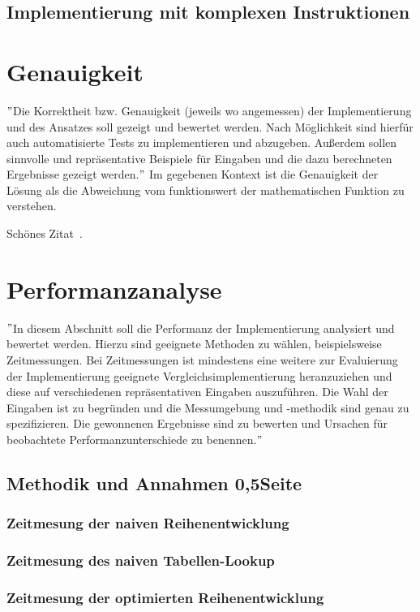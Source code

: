 \documentclass[course=erap]{aspdoc}
\begin{document}
\subsection{Implementierung mit komplexen Instruktionen}

\section{Genauigkeit}
\("\)Die Korrektheit bzw. Genauigkeit (jeweils wo angemessen) der Implementierung und des Ansatzes soll gezeigt und bewertet werden. Nach Möglichkeit sind hierfür auch automatisierte Tests zu implementieren und abzugeben. Außerdem sollen sinnvolle und repräsentative Beispiele für Eingaben und die dazu berechneten Ergebnisse gezeigt werden.\("\)
Im gegebenen Kontext ist die Genauigkeit der Lösung als die Abweichung vom funktionswert der mathematischen Funktion zu verstehen.

Schönes Zitat~\cite{buch}.

\section{Performanzanalyse}
\("\)In diesem Abschnitt soll die Performanz der Implementierung analysiert und bewertet werden. Hierzu sind geeignete Methoden zu wählen, beispielsweise Zeitmessungen. Bei Zeitmessungen ist mindestens eine weitere zur Evaluierung der Implementierung geeignete Vergleichsimplementierung heranzuziehen und diese auf verschiedenen repräsentativen Eingaben auszuführen. Die Wahl der Eingaben ist zu begründen und die Messumgebung und -methodik sind genau zu spezifizieren. Die gewonnenen Ergebnisse sind zu bewerten und Ursachen für beobachtete Performanzunterschiede zu benennen.\("\)

\subsection{Methodik und Annahmen 0,5Seite}

\subsubsection{Zeitmesung der naiven Reihenentwicklung}
\subsubsection{Zeitmesung des naiven Tabellen-Lookup}
\subsubsection{Zeitmesung der optimierten Reihenentwicklung}
\end{document}
